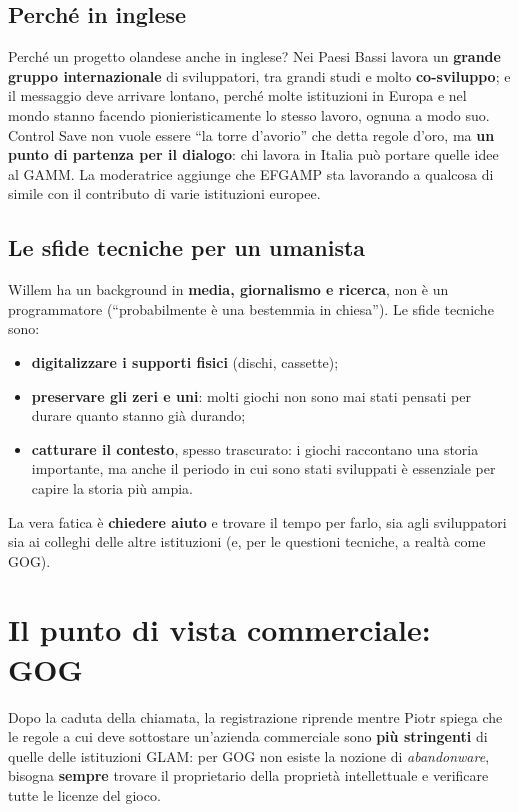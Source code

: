 \subsection{Perché in inglese}

Perché un progetto olandese anche in inglese? Nei Paesi Bassi lavora un
\textbf{grande gruppo internazionale} di sviluppatori, tra grandi studi e molto
\textbf{co-sviluppo}; e il messaggio deve arrivare lontano, perché molte
istituzioni in Europa e nel mondo stanno facendo pionieristicamente lo stesso
lavoro, ognuna a modo suo. Control Save non vuole essere ``la torre d'avorio''
che detta regole d'oro, ma \textbf{un punto di partenza per il dialogo}: chi
lavora in Italia può portare quelle idee al GAMM. La moderatrice aggiunge che
EFGAMP sta lavorando a qualcosa di simile con il contributo di varie
istituzioni europee.

\subsection{Le sfide tecniche per un umanista}

Willem ha un background in \textbf{media, giornalismo e ricerca}, non è un
programmatore (``probabilmente è una bestemmia in chiesa''). Le sfide tecniche
sono:
\begin{itemize}
  \item \textbf{digitalizzare i supporti fisici} (dischi, cassette);
  \item \textbf{preservare gli zeri e uni}: molti giochi non sono mai stati
        pensati per durare quanto stanno già durando;
  \item \textbf{catturare il contesto}, spesso trascurato: i giochi raccontano
        una storia importante, ma anche il periodo in cui sono stati sviluppati
        è essenziale per capire la storia più ampia.
\end{itemize}
La vera fatica è \textbf{chiedere aiuto} e trovare il tempo per farlo, sia agli
sviluppatori sia ai colleghi delle altre istituzioni (e, per le questioni
tecniche, a realtà come GOG).

\section{Il punto di vista commerciale: GOG}
\label{sec:c1-4-gog}

Dopo la caduta della chiamata, la registrazione riprende mentre Piotr spiega che
le regole a cui deve sottostare un'azienda commerciale sono \textbf{più
stringenti} di quelle delle istituzioni GLAM: per GOG non esiste la nozione di
\emph{abandonware}, bisogna \textbf{sempre} trovare il proprietario della
proprietà intellettuale e verificare tutte le licenze del gioco.

